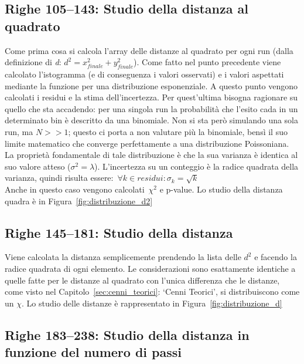 \documentclass[a4paper,12pt]{article}
\begin{document}
\subsection{Righe 105--143: Studio della distanza al quadrato}

Come prima cosa si calcola l'array delle distanze al quadrato per ogni run (dalla definizione di \textit{d}: $d^2 = x_{finale}^2 + y_{finale}^2$). Come fatto nel punto precedente viene calcolato l'istogramma (e di conseguenza i valori osservati) e i valori aspettati mediante la funzione per una distribuzione esponenziale.
A questo punto vengono calcolati i residui e la stima dell'incertezza.
Per quest'ultima bisogna ragionare su quello che sta accadendo: per una singola run la probabilità che l'esito cada in un determinato bin è descritto da una binomiale. Non si sta però simulando una sola run, ma $N >> 1$; questo ci porta a non valutare più la binomiale, bensì il suo limite matematico che converge perfettamente a una distribuzione Poissoniana. La proprietà fondamentale di tale distribuzione è che la sua varianza è identica al suo valore atteso ($\sigma^2 = \lambda$).
L'incertezza su un conteggio è la radice quadrata della varianza, quindi risulta essere:~$\forall k \in {residui}: \sigma_k = \sqrt{k}$\\
Anche in questo caso vengono calcolati~$\chi^2$ e p-value. Lo studio della distanza quadra è in Figura~\ref{fig:distribuzione_d2}

\subsection{Righe 145--181: Studio della distanza}

Viene calcolata la distanza semplicemente prendendo la lista delle $d^2$ e facendo la radice quadrata di ogni elemento. Le considerazioni sono esattamente identiche a quelle fatte per le distanze al quadrato con l'unica differenza che le distanze, come visto nel Capitolo~\ref{sec:cenni_teorici}: `Cenni Teorici', si distribuiscono come un $\chi$. Lo studio delle distanze è rappresentato in Figura~\ref{fig:distribuzione_d}

\subsection{Righe 183--238: Studio della distanza in funzione del numero di passi}
\end{document}
